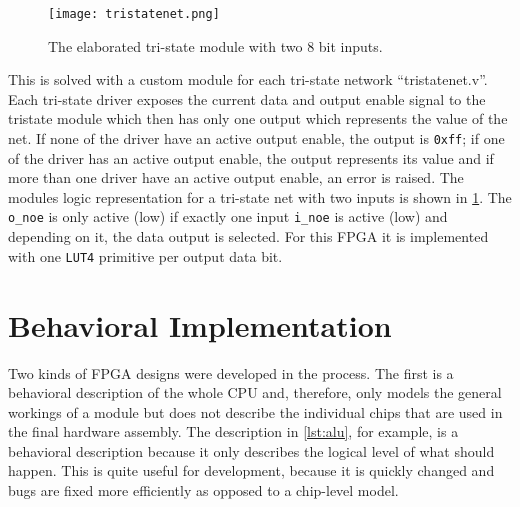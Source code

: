 \begin{figure}[t]
  \centering
  \texttt{[image: tristatenet.png]}
  \caption{The elaborated tri-state module with two 8 bit inputs.}
  \label{fig:tristatenet}
\end{figure}
This is solved with a custom module for each tri-state network ``tristatenet.v''.
Each tri-state driver exposes the current data and output enable signal to the tristate module which then has only one output which represents the value of the net.
If none of the driver have an active output enable, the output is \texttt{0xff}; if one of the driver has an active output enable, the output represents its value and if more than one driver have an active output enable, an error is raised.
The modules logic representation for a tri-state net with two inputs is shown in \cref{fig:tristatenet}.
The \texttt{o\_noe} is only active (low) if exactly one input \texttt{i\_noe} is active (low) and depending on it, the data output is selected.
For this \gls{FPGA} it is implemented with one \texttt{LUT4} primitive per output data bit.

\section{Behavioral Implementation}
Two kinds of \gls{FPGA} designs were developed in the process.
The first is a behavioral description of the whole \gls{CPU} and, therefore, only models the general workings of a module but does not describe the individual chips that are used in the final hardware assembly.
The description in \cref{lst:alu}, for example, is a behavioral description because it only describes the logical level of what should happen.
This is quite useful for development, because it is quickly changed and bugs are fixed more efficiently as opposed to a chip-level model.

